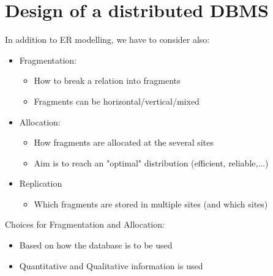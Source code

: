 \documentclass{article}[18pt]
\begin{document}
\section{Design of a distributed DBMS}
In addition to ER modelling, we have to consider also:
\begin{itemize}
	\item Fragmentation:
	\begin{itemize}
		\item How to break a relation into fragments
		\item Fragments can be horizontal/vertical/mixed
	\end{itemize}
	\item Allocation: 
	\begin{itemize}
		\item How fragments are allocated at the several sites
		\item Aim is to reach an "optimal" distribution (efficient, reliable,...)
	\end{itemize}
	\item Replication
	\begin{itemize}
		\item Which fragments are stored in multiple sites (and which sites)
	\end{itemize}
\end{itemize}
Choices for Fragmentation and Allocation:
\begin{itemize}
	\item Based on how the database is to be used
	\item Quantitative and Qualitative information is used
\end{itemize}
\end{document}
